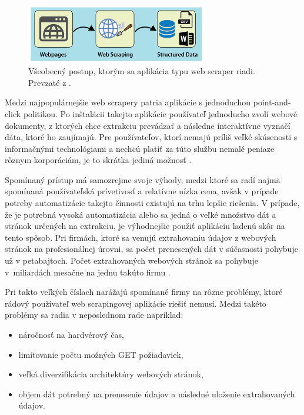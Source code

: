 \begin{figure}[hbt]
	\centering
	\includegraphics[width=0.7\textwidth]{obrazky-figures/web-scraping-using-python.png}
	\caption{Všeobecný postup, ktorým sa aplikácia typu web scraper riadi. Prevzaté z \cite{WebScrap}.}
	\label{WebScrap_img}
\end{figure}

\bigskip

Medzi najpopulárnejšie web scrapery patria aplikácie s jednoduchou point-and-click politikou. Po inštalácii takejto aplikácie používateľ jednoducho zvolí webové dokumenty, z ktorých chce extrakciu prevádzať a následne interaktívne vyznačí dáta, ktoré ho zaujímajú. Pre používateľov, ktorí nemajú príliš veľké skúsenosti s informačnými technológiami a nechcú platiť za túto službu nemalé peniaze rôznym korporáciám, je to skrátka jediná možnosť \cite{scrapers}.

\bigskip

Spomínaný prístup má samozrejme svoje výhody, medzi ktoré sa radí najmä spomínaná používateľská prívetivosť a relatívne nízka cena, avšak v prípade potreby automatizácie takejto činnosti existujú na trhu lepšie riešenia. V prípade, že je potrebná vysoká automatizácia alebo sa jedná o veľké množstvo dát a stránok určených na extrakciu, je výhodnejšie použiť aplikáciu ladenú skôr na tento spôsob. Pri firmách, ktoré sa venujú extrahovaniu údajov z webových stránok na profesionálnej úrovni, sa počet prenesených dát v súčasnosti pohybuje už v petabajtoch. Počet extrahovaných webových stránok sa pohybuje v~miliardách mesačne na jednu takúto firmu \cite{JanCurna:online}.

Pri takto veľkých číslach narážajú spomínané firmy na rôzne problémy, ktoré rádový používateľ web scrapingovej aplikácie riešiť nemusí. Medzi takéto problémy sa radia v neposlednom rade napríklad:
\begin{itemize}
    \item náročnosť na hardvérový čas,
    \item limitovanie počtu možných GET požiadaviek,
    \item veľká diverzifikácia architektúry webových stránok,
    \item objem dát potrebný na prenesenie údajov a následné uloženie extrahovaných údajov.
\end{itemize}


